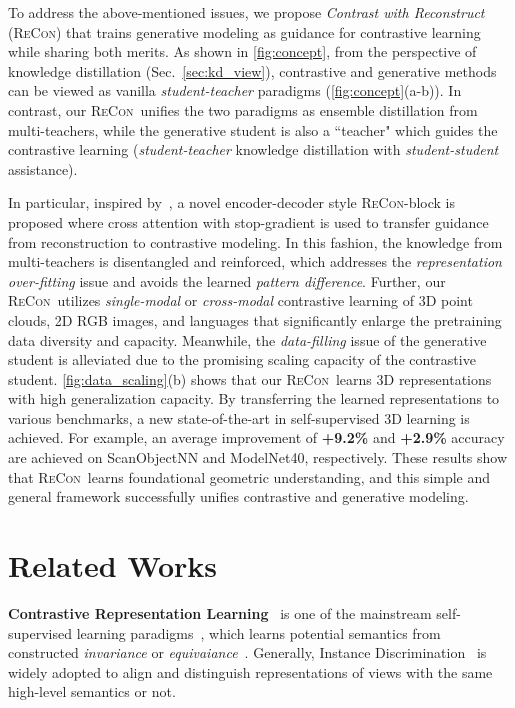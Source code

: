 \documentclass{article}
\theoremstyle{plain}
\theoremstyle{definition}
\theoremstyle{remark}
\def\recon{{\scshape ReCon}}
\begin{document}
To address the above-mentioned issues, we propose \textit{Contrast with Reconstruct} (\recon) that trains generative modeling as guidance for contrastive learning while sharing both merits.
As shown in \cref{fig:concept}, from the perspective of knowledge distillation (Sec.~\ref{sec:kd_view}), contrastive and generative methods can be viewed as vanilla \textit{student-teacher} paradigms (\cref{fig:concept}(a-b)). 
In contrast, our \recon\ unifies the two paradigms as ensemble distillation from multi-teachers, while the generative student is also a ``teacher" which guides the contrastive learning (\textit{student-teacher} knowledge distillation with \textit{student-student} assistance).

In particular, inspired by~\citet{AttentionIsAllYouNeed}, a novel encoder-decoder style \recon-block is proposed where cross attention with stop-gradient is used to transfer guidance from reconstruction to contrastive modeling.
In this fashion, the knowledge from multi-teachers is disentangled and reinforced, which addresses the \textit{representation over-fitting} issue and avoids the learned \textit{pattern difference}.
Further, our \recon~utilizes \textit{single-modal} or \textit{cross-modal} contrastive learning of 3D point clouds, 2D RGB images, and languages that significantly enlarge the pretraining data diversity and capacity. 
Meanwhile, the \textit{data-filling} issue of the generative student is alleviated due to the promising scaling capacity of the contrastive student.
\cref{fig:data_scaling}(b) shows that our \recon~learns 3D representations with high generalization capacity.
By transferring the learned representations to various benchmarks, a new state-of-the-art in self-supervised 3D learning is achieved. For example, an average improvement of \textbf{+9.2\%} and \textbf{+2.9\%} accuracy are achieved on ScanObjectNN and ModelNet40, respectively.
These results show that \recon\ learns foundational geometric understanding, and this simple and general framework successfully unifies contrastive and generative modeling. \section{Related Works}
\textbf{Contrastive Representation Learning}~
is one of the mainstream self-supervised learning paradigms~\citep{LeCunContrastive}, which learns potential semantics from constructed \textit{invariance} or \textit{equivaiance}~\citep{EquivariantSSL22}.
Generally, Instance Discrimination~\citep{InstanceDiscrimination18} is widely adopted to align and distinguish representations of views with the same high-level semantics or not. 
\end{document}
